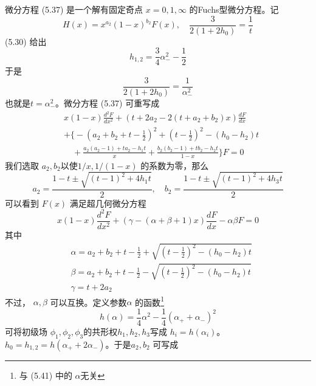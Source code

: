 微分方程 (5.37) 是一个解有固定奇点 $x=0,1,\infty$ 的Fuchs型微分方程。记
\begin{equation}
	H(x)=x^{a_{2}}(1-x)^{b_{2}} F(x), \quad \frac{3}{2\left(1+2 h_{0}\right)}=\frac{1}{t}
\end{equation}
(5.30) 给出
$$
h_{1,2}=\frac{3}{4} \alpha_{-}^{2}-\frac{1}{2}
$$
于是
$$
\frac{3}{2\left(1+2 h_{0}\right)}=\frac{1}{\alpha_{-}^{2}}
$$
也就是$ t=\alpha_-^2 $。微分方程 (5.37) 可重写成
\begin{equation}
	\begin{aligned} &x(1-x) \frac{d^{2} F}{d x^{2}}+\left(t+2 a_{2}-2\left(t+a_{2}+b_{2}\right) x\right) \frac{d F}{d x} \\& +\Bigg\{-\left(a_{2}+b_{2}+t-\frac{1}{2}\right)^{2}+\left(t-\frac{1}{2}\right)^{2}-\left(h_{0}-h_{2}\right) t\\&\quad +\frac{a_{2}\left(a_{2}-1\right)+t a_{2}-h_{1} t}{x}+\frac{b_{2}\left(b_{2}-1\right)+t b_{2}-h_{2} t}{1-x}\Bigg\} F=0 \end{aligned}
\end{equation}
我们选取 $a_2,b_2 $以使$ 1/x,1/(1-x)$ 的系数为零，那么
\begin{equation}
	a_{2}=\frac{1-t \pm \sqrt{(t-1)^{2}+4 h_{1} t}}{2}, \quad b_{2}=\frac{1-t \pm \sqrt{(t-1)^{2}+4 h_{3} t}}{2}
\end{equation}
可以看到 $F(x)$ 满足超几何微分方程
\begin{equation}
	x(1-x) \frac{d^{2} F}{d x^{2}}+(\gamma-(\alpha+\beta+1) x) \frac{d F}{d x}-\alpha \beta F=0
\end{equation}
其中
\begin{equation}
	\begin{aligned} &\alpha=a_{2}+b_{2}+t-\frac{1}{2}+\sqrt{\left(t-\frac{1}{2}\right)^{2}-\left(h_{0}-h_{2}\right) t} \\& \beta=a_{2}+b_{2}+t-\frac{1}{2}-\sqrt{\left(t-\frac{1}{2}\right)^{2}-\left(h_{0}-h_{2}\right) t} \\& \gamma=t+2 a_{2} \end{aligned}
\end{equation}
不过， $\alpha,\beta$ 可以互换。定义参数$ \alpha$ 的函数\footnote{与 (5.41) 中的 $\alpha $无关}
\begin{equation}
	h(\alpha)=\frac{1}{4} \alpha^{2}-\frac{1}{4}\left(\alpha_{+}+\alpha_{-}\right)^{2}
\end{equation}
可将初级场 $\phi_1,\phi_2,\phi_3 $的共形权$ h_1,h_2,h_3 $写成 $h_{i}=h\left(\alpha_{i}\right) $。 $h_{0}=h_{1,2}=h\left(\alpha_{+}+2 \alpha_{-}\right) $。于是$ a_2,b_2$ 可写成

